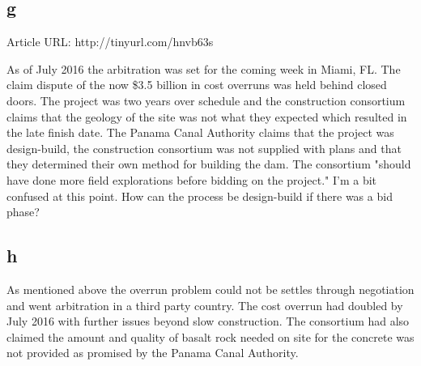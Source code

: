 \documentclass[12pt]{article} %
\begin{document}
	\subsection{g}
		Article URL: {\small http://tinyurl.com/hnvb63s}
		\newline
		
		As of July 2016 the arbitration was set for the coming week in Miami, FL. The claim dispute of the now \$3.5 billion in cost overruns was held behind closed doors. The project was two years over schedule and the construction consortium claims that the geology of the site was not what they expected which resulted in the late finish date. The Panama Canal Authority claims that the project was design-build, the construction consortium was not supplied with plans and that they determined their own method for building the dam. The consortium "should have done more field explorations before bidding on the project."
		\newline
		\newline
		I'm a bit confused at this point. How can the process be design-build if there was a bid phase?
		
	\subsection{h}
		As mentioned above the overrun problem could not be settles through negotiation and went arbitration in a third party country. The cost overrun had doubled by July 2016 with further issues beyond slow construction. The consortium had also claimed the amount and quality of basalt rock needed on site for the concrete was not provided as promised by the Panama Canal Authority.
		
\end{document}
